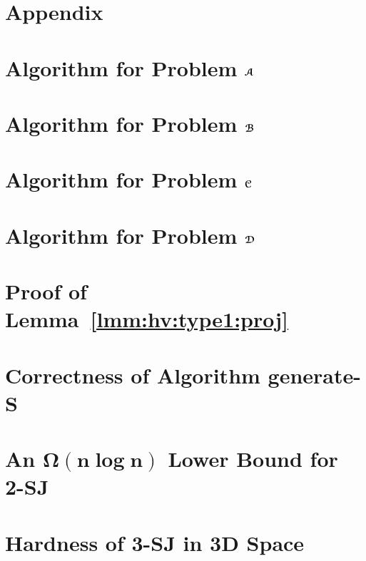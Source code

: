\documentclass[sigconf]{acmart}
\begin{document}


\balance

\appendix 

\section*{Appendix}

\section{Algorithm for Problem $\textrm{\boldmath${\EuScript{A}}$}$} \label{app:prob-a}

\section{Algorithm for Problem $\textrm{\boldmath${\EuScript{B}}$}$} \label{app:prob-b}

\section{Algorithm for Problem $\textrm{\boldmath${\EuScript{C}}$}$} \label{app:prob-c}

\section{Algorithm for Problem $\textrm{\boldmath${\EuScript{D}}$}$} \label{app:prob-d}

\section{Proof of Lemma~\ref{lmm:hv:type1:proj}} \label{app:lmm:hv:type1:proj} 

\section{Correctness of Algorithm generate-S} \label{app:hv:type1:gen-S}

\section{An $\bm{\Omega(n \log n)}$ Lower Bound for 2-SJ} \label{app:lb}

\section{Hardness of 3-SJ in 3D Space} \label{app:lb-cond}

\end{document}
